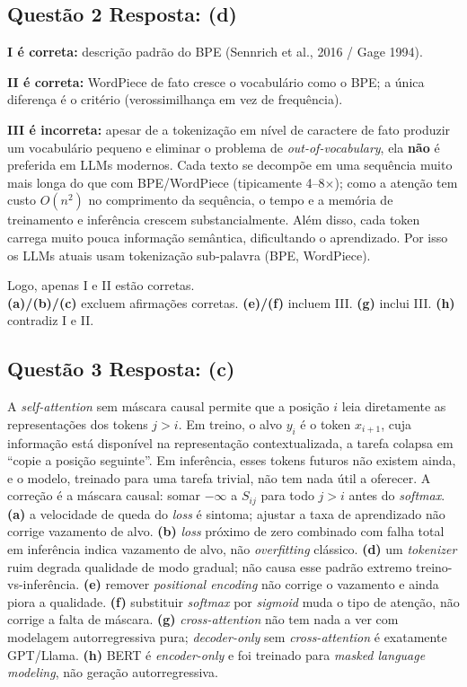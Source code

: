 \documentclass[11pt,a4paper]{article}
\begin{document}
\subsection*{Questão 2 \textemdash{} Resposta: (d)}
\textbf{I é correta:} descrição padrão do BPE (Sennrich et al., 2016 / Gage 1994).

\textbf{II é correta:} WordPiece de fato cresce o vocabulário como o BPE; a única diferença é o critério (verossimilhança em vez de frequência).

\textbf{III é incorreta:} apesar de a tokenização em nível de caractere de fato produzir um vocabulário pequeno e eliminar o problema de \textit{out-of-vocabulary}, ela \textbf{não} é preferida em LLMs modernos. Cada texto se decompõe em uma sequência muito mais longa do que com BPE/WordPiece (tipicamente 4--8$\times$); como a atenção tem custo $O(n^2)$ no comprimento da sequência, o tempo e a memória de treinamento e inferência crescem substancialmente. Além disso, cada token carrega muito pouca informação semântica, dificultando o aprendizado. Por isso os LLMs atuais usam tokenização sub-palavra (BPE, WordPiece).

Logo, apenas I e II estão corretas.\\
\textbf{(a)/(b)/(c)} excluem afirmações corretas.
\textbf{(e)/(f)} incluem III.
\textbf{(g)} inclui III.
\textbf{(h)} contradiz I e II.

\subsection*{Questão 3 \textemdash{} Resposta: (c)}
A \textit{self-attention} sem máscara causal permite que a posição $i$ leia diretamente as representações dos tokens $j > i$. Em treino, o alvo $y_i$ é o token $x_{i+1}$, cuja informação está disponível na representação contextualizada, a tarefa colapsa em ``copie a posição seguinte''. Em inferência, esses tokens futuros não existem ainda, e o modelo, treinado para uma tarefa trivial, não tem nada útil a oferecer. A correção é a máscara causal: somar $-\infty$ a $S_{ij}$ para todo $j > i$ antes do \textit{softmax}.\\
\textbf{(a)} a velocidade de queda do \textit{loss} é sintoma; ajustar a taxa de aprendizado não corrige vazamento de alvo.
\textbf{(b)} \textit{loss} próximo de zero combinado com falha total em inferência indica vazamento de alvo, não \textit{overfitting} clássico.
\textbf{(d)} um \textit{tokenizer} ruim degrada qualidade de modo gradual; não causa esse padrão extremo treino-vs-inferência.
\textbf{(e)} remover \textit{positional encoding} não corrige o vazamento e ainda piora a qualidade.
\textbf{(f)} substituir \textit{softmax} por \textit{sigmoid} muda o tipo de atenção, não corrige a falta de máscara.
\textbf{(g)} \textit{cross-attention} não tem nada a ver com modelagem autorregressiva pura; \textit{decoder-only} sem \textit{cross-attention} é exatamente GPT/Llama.
\textbf{(h)} BERT é \textit{encoder-only} e foi treinado para \textit{masked language modeling}, não geração autorregressiva.
\end{document}
